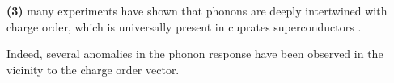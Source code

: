 \documentclass[11pt]{article}
\begin{document}
\textbf{(3)} many experiments have shown that phonons are deeply intertwined with charge order, which is universally present in cuprates superconductors \cite{arpaia_charge_2021,comin_resonant_2016,canosa_resonant_2014, hucker_competing_2014, chang_direct_2012,ghiringhelli_long-range_2012,wang_charge_2021,lin_strongly_2020, huang_quantum_2021,miao_incommensurate_2018,tacon_inelastic_2014,li_multiorbital_2020,braicovich_determining_2020,chaix_dispersive_2017,peng_enhanced_2020}. 

Indeed, several anomalies in the phonon response have been observed in the vicinity to the charge order vector.
%
\end{document}
